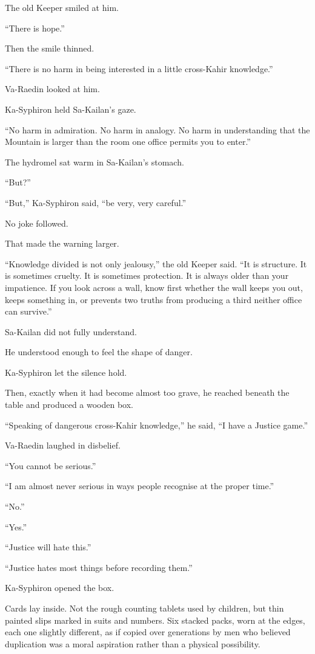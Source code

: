 The old Keeper smiled at him.\par
“There is hope.”\par
Then the smile thinned.\par
“There is no harm in being interested in a little cross-Kahir knowledge.”\par
Va-Raedin looked at him.\par
Ka-Syphiron held Sa-Kailan’s gaze.\par
“No harm in admiration. No harm in analogy. No harm in understanding that the Mountain is larger than the room one office permits you to enter.”\par
The hydromel sat warm in Sa-Kailan’s stomach.\par
“But?”\par
“But,” Ka-Syphiron said, “be very, very careful.”\par
No joke followed.\par
That made the warning larger.\par
“Knowledge divided is not only jealousy,” the old Keeper said. “It is structure. It is sometimes cruelty. It is sometimes protection. It is always older than your impatience. If you look across a wall, know first whether the wall keeps you out, keeps something in, or prevents two truths from producing a third neither office can survive.”\par
Sa-Kailan did not fully understand.\par
He understood enough to feel the shape of danger.\par
Ka-Syphiron let the silence hold.\par
Then, exactly when it had become almost too grave, he reached beneath the table and produced a wooden box.\par
“Speaking of dangerous cross-Kahir knowledge,” he said, “I have a Justice game.”\par
Va-Raedin laughed in disbelief.\par
“You cannot be serious.”\par
“I am almost never serious in ways people recognise at the proper time.”\par
“No.”\par
“Yes.”\par
“Justice will hate this.”\par
“Justice hates most things before recording them.”\par
Ka-Syphiron opened the box.\par
Cards lay inside. Not the rough counting tablets used by children, but thin painted slips marked in suits and numbers. Six stacked packs, worn at the edges, each one slightly different, as if copied over generations by men who believed duplication was a moral aspiration rather than a physical possibility.\par
